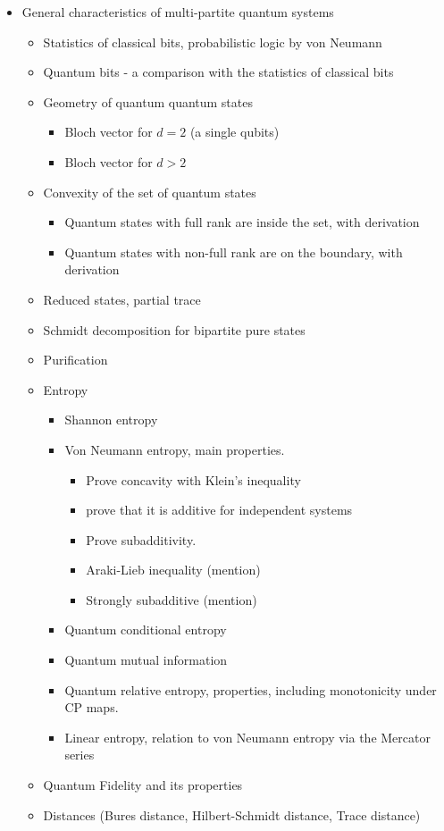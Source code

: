 \documentclass[11pt, oneside]{article}   	%
\begin{document}
\begin{itemize}
\item General characteristics of multi-partite quantum systems
\begin{itemize}
\item Statistics of classical bits, probabilistic logic by von Neumann
\item Quantum bits - a comparison with the statistics of classical bits
\item Geometry of quantum quantum states
\begin{itemize}
\item Bloch vector for $d=2$ (a single qubits)
\item Bloch vector for $d>2$
\end{itemize}
\item Convexity of the set of quantum states 
\begin{itemize}
\item Quantum states with full rank are inside the set, with derivation
\item Quantum states with non-full rank are on the boundary, with derivation
\end{itemize}
\item Reduced states, partial trace
\item Schmidt decomposition for bipartite pure states
\item Purification
\item Entropy
\begin{itemize}
\item Shannon entropy
\item Von Neumann entropy, main properties.
\begin{itemize}
\item Prove concavity with Klein’s inequality
\item prove that it is additive for independent systems
\item Prove subadditivity.
\item Araki-Lieb inequality (mention)
\item Strongly subadditive (mention)
 \end{itemize} 
\item Quantum conditional entropy
\item Quantum mutual information
\item Quantum relative entropy, properties, including monotonicity under CP maps.
\item Linear entropy, relation to von Neumann entropy via the Mercator series
\end{itemize} 
\item Quantum Fidelity and its properties
\item Distances (Bures distance, Hilbert-Schmidt distance, Trace distance)
\end{itemize}


\end{itemize}
\end{document}
